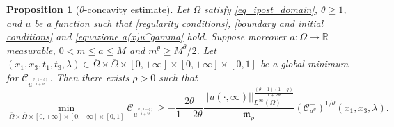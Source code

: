 \documentclass[11pt, reqno]{amsart}
\newtheorem{proposition}[lemma]{Proposition}
\theoremstyle{definition}
\numberwithin{equation}{section}
\newcommand{\Omegabar}{\overline{\Omega}}
\newcommand{\R}{\mathbb{R}}
\begin{document}
\begin{proposition}[$\theta$-concavity estimate]
\label{prop_theta_concav_estim}
Let $\Omega$ satisfy \eqref{eq_ipost_domain}, $\theta \geq 1$,
and $u$ be a function such that \eqref{regularity conditions}, \eqref{boundary and initial conditions} and \eqref{equazione a(x)u^gamma} hold. 
Suppose moreover $a\colon\Omega \to \R$ measurable, $0< m\leq a\leq M$ and $m^\theta\geq M^{\theta}/2$. 
Let $(x_1,x_3,t_1,t_3,\lambda)\in \Omegabar\times \Omegabar\times [0,+\infty]\times [0,+\infty]\times [0,1]$ be a global minimum for $\mathcal{C}_{u^{\frac{\theta(1-q)}{1+2\theta}}}$. 
Then there exists $\rho>0$ such that
\[	\min_{\Omegabar\times \Omegabar\times[0,+\infty]\times [0,+\infty]\times[0,1]}\mathcal{C}_{u^{\frac{\theta(1-q)}{1+2\theta}}}
\geq
-\frac{2\theta }{1+2\theta}\frac{||u(\cdot, \infty)||_{L^{\infty}(\Omega)}^{\frac{(\theta-1)(1-q)}{1+2\theta}}}{ \mathfrak{m}_{\rho} }(\mathcal{C}^-_{a^{\theta}})^{1/\theta}(x_1,x_3,\lambda).\]
\end{proposition}
\end{document}
